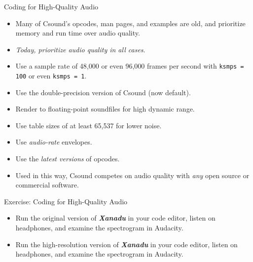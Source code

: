 \documentclass{beamer}
\begin{document}
    \begin{frame}{Coding for High-Quality Audio}
        \begin{itemize}
            \item Many of Csound's opcodes, man pages, and examples are old, and
            prioritize memory and run time over audio quality.
            \item \textit{Today, prioritize audio quality in all cases}.
            \item Use a sample rate of 48,000 or even 96,000 frames per second with
            \texttt{ksmps = 100} or even \texttt{ksmps = 1}.
            \item Use the double-precision version of Csound (now default).
            \item Render to floating-point soundfiles for high dynamic range.
            \item Use table sizes of at least 65,537 for lower noise.
            \item Use \textit{audio-rate} envelopes.
            \item Use the \textit{latest versions} of opcodes.
            \item Used in this way, Csound competes on audio quality with
            \textit{any} open source or commercial software.
        \end{itemize}
    \end{frame}
    
    \begin{frame}{Exercise: Coding for High-Quality Audio}
        \begin{itemize}
            \item Run the original version of \textit{\textbf{Xanadu}} in your code
            editor, listen on headphones, and examine the spectrogram in Audacity.
            \item Run the high-resolution version of \textit{\textbf{Xanadu}} in
            your code editor, listen on headphones, and examine the spectrogram in Audacity.
        \end{itemize}
    \end{frame}
    
\end{document}
